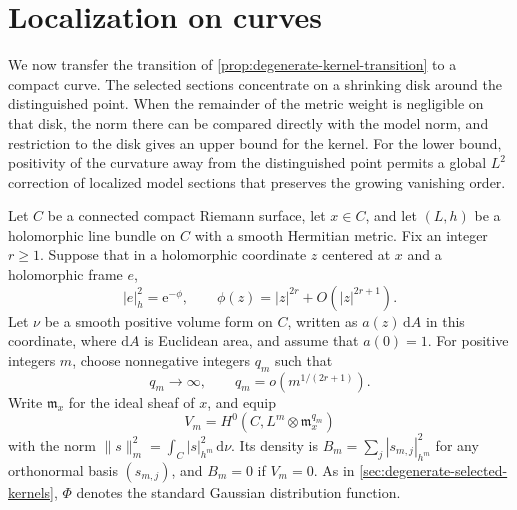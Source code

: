 \section{Localization on curves}
\label{sec:compact-growing-jets}

We now transfer the transition of \cref{prop:degenerate-kernel-transition} to a compact curve. The selected sections concentrate on a shrinking disk around the distinguished point. When the remainder of the metric weight is negligible on that disk, the norm there can be compared directly with the model norm, and restriction to the disk gives an upper bound for the kernel. For the lower bound, positivity of the curvature away from the distinguished point permits a global $L^2$ correction of localized model sections that preserves the growing vanishing order.

Let $C$ be a connected compact Riemann surface, let $x\in C$, and let $(L,h)$ be a holomorphic line bundle on $C$ with a smooth Hermitian metric. Fix an integer $r\geq1$. Suppose that in a holomorphic coordinate $z$ centered at $x$ and a holomorphic frame $e$,
\[
 |e|_h^2=\mathrm{e}^{-\phi},\qquad
 \phi(z)=|z|^{2r}+O(|z|^{2r+1}).
\]
Let $\nu$ be a smooth positive volume form on $C$, written as $a(z)\,\mathrm{d}A$ in this coordinate, where $\mathrm{d}A$ is Euclidean area, and assume that $a(0)=1$. For positive integers $m$, choose nonnegative integers $q_m$ such that
\[
 q_m\longrightarrow\infty,\qquad q_m=o(m^{1/(2r+1)}).
\]
Write $\mathfrak m_x$ for the ideal sheaf of $x$, and equip
\[
 V_m=H^0(C,L^m\otimes\mathfrak m_x^{q_m})
\]
with the norm $\|s\|_m^2=\int_C|s|_{h^m}^2\,\mathrm{d}\nu$. Its density is $B_m=\sum_j|s_{m,j}|_{h^m}^2$ for any orthonormal basis $(s_{m,j})$, and $B_m=0$ if $V_m=0$. As in \cref{sec:degenerate-selected-kernels}, $\Phi$ denotes the standard Gaussian distribution function.

